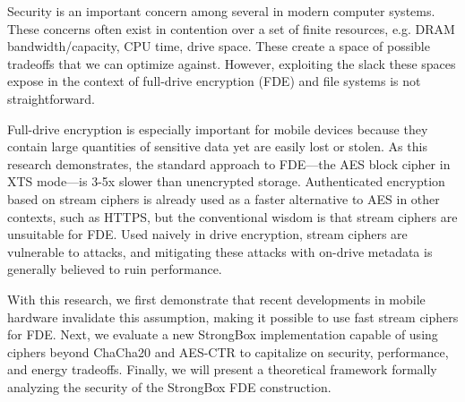 Security is an important concern among several in modern computer systems. These
concerns often exist in contention over a set of finite resources, e.g. DRAM
bandwidth/capacity, CPU time, drive space. These create a space of possible
tradeoffs that we can optimize against. However, exploiting the slack these
spaces expose in the context of full-drive encryption (FDE) and file systems is
not straightforward.

Full-drive encryption is especially important for mobile devices because they
contain large quantities of sensitive data yet are easily lost or stolen. As
this research demonstrates, the standard approach to FDE—the AES block cipher in
XTS mode—is 3-5x slower than unencrypted storage. Authenticated encryption based
on stream ciphers is already used as a faster alternative to AES in other
contexts, such as HTTPS, but the conventional wisdom is that stream ciphers are
unsuitable for FDE. Used naively in drive encryption, stream ciphers are
vulnerable to attacks, and mitigating these attacks with on-drive metadata is
generally believed to ruin performance.

With this research, we first demonstrate that recent developments in mobile
hardware invalidate this assumption, making it possible to use fast stream
ciphers for FDE. Next, we evaluate a new StrongBox implementation capable of
using ciphers beyond ChaCha20 and AES-CTR to capitalize on security,
performance, and energy tradeoffs. Finally, we will present a theoretical
framework formally analyzing the security of the StrongBox FDE construction.
